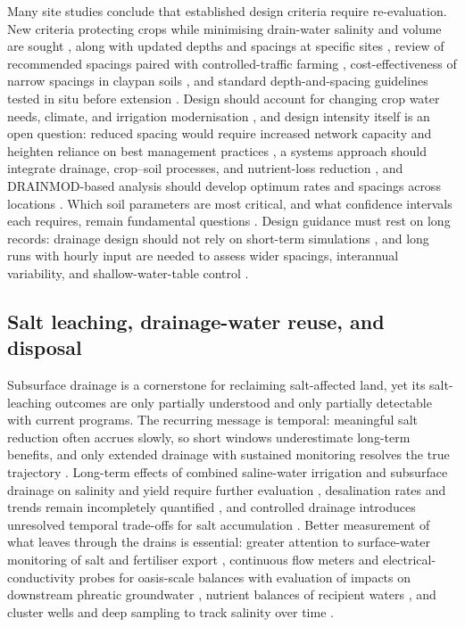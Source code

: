 \documentclass[11pt]{article}
\begin{document}
Many site studies conclude that established design criteria require re-evaluation.
New criteria protecting crops while minimising drain-water salinity and volume are
sought \parencite{Christen2001}, along with updated depths and spacings at specific
sites \parencite{Muhammad2021,Malota2016,Bahçeci2009,Kahlown2002}, review of
recommended spacings paired with controlled-traffic farming
\parencite{Mante2022,Mante2018}, cost-effectiveness of narrow spacings in claypan
soils \parencite{Nelson2017}, and standard depth-and-spacing guidelines tested
in situ before extension \parencite{HajAmor2019}. Design should account for
changing crop water needs, climate, and irrigation modernisation
\parencite{Rui2024,Akram2013,Ziaeifar2025,Ritzema2023,Ritzema2007,Ritzema2006,Ritzema2011},
and design intensity itself is an open question: reduced spacing would require
increased network capacity and heighten reliance on best management practices
\parencite{Singh2009,Dialameh2025}, a systems approach should integrate drainage,
crop--soil processes, and nutrient-loss reduction \parencite{Castellano2019}, and
DRAINMOD-based analysis should develop optimum rates and spacings across locations
\parencite{Strock2011}. Which soil parameters are most critical, and what
confidence intervals each requires, remain fundamental questions
\parencite{Ayars2015,SHIRMOHAMMADI1995,HARDJOAMIDJOJO1982}. Design guidance must
rest on long records: drainage design should not rely on short-term simulations
\parencite{Wang2006b}, and long runs with hourly input are needed to assess wider
spacings, interannual variability, and shallow-water-table control
\parencite{Ale2009,Häggblom2019,Malota2015,Salo2019,Kladivko2023,Chang2012}.

\subsection{Salt leaching, drainage-water reuse, and disposal}

Subsurface drainage is a cornerstone for reclaiming salt-affected land, yet its
salt-leaching outcomes are only partially understood and only partially detectable
with current programs. The recurring message is temporal: meaningful salt
reduction often accrues slowly, so short windows underestimate long-term benefits,
and only extended drainage with sustained monitoring resolves the true trajectory
\parencite{Almen2021,Daigh2025}. Long-term effects of combined saline-water
irrigation and subsurface drainage on salinity and yield require further evaluation
\parencite{Feng2017,Feng2021}, desalination rates and trends remain incompletely
quantified \parencite{Guo2024b,Yao2024}, and controlled drainage introduces
unresolved temporal trade-offs for salt accumulation
\parencite{Jouni2018,Lu2019,Islam2025,Heng2021}. Better measurement of what leaves
through the drains is essential: greater attention to surface-water monitoring of
salt and fertiliser export \parencite{Mastrocicco2013}, continuous flow meters and
electrical-conductivity probes for oasis-scale balances with evaluation of impacts
on downstream phreatic groundwater \parencite{Askri2022}, nutrient balances of
recipient waters \parencite{Turtola1995}, and cluster wells and deep sampling to
track salinity over time \parencite{Singh2020d,Gafni2001}.
\end{document}
